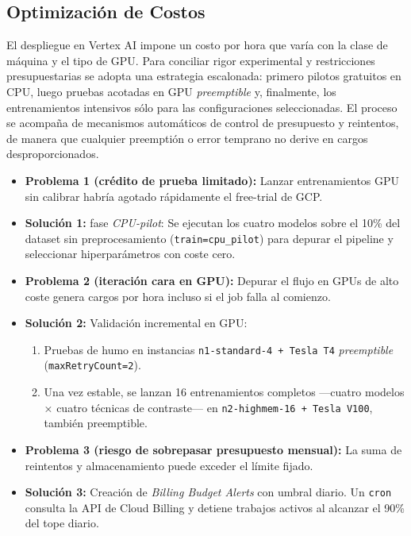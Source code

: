 \subsection{Optimización de Costos}

El despliegue en Vertex AI impone un costo por hora que varía con la clase de máquina y el tipo de GPU.
Para conciliar rigor experimental y restricciones presupuestarias se adopta una estrategia escalonada: primero pilotos gratuitos en CPU, luego pruebas acotadas en GPU \emph{preemptible} y, finalmente, los entrenamientos intensivos sólo para las configuraciones seleccionadas.
El proceso se acompaña de mecanismos automáticos de control de presupuesto y reintentos, de manera que cualquier preemptión o error temprano no derive en cargos desproporcionados.

\begin{itemize}
   \item \textbf{Problema 1 (crédito de prueba limitado):}
   Lanzar entrenamientos GPU sin calibrar habría agotado rápidamente el free-trial de GCP.
   \item \textbf{Solución 1:} fase \textit{CPU-pilot}:
   Se ejecutan los cuatro modelos sobre el 10\% del dataset sin preprocesamiento (\texttt{train=cpu\_pilot}) para depurar el pipeline y seleccionar hiperparámetros con coste cero.

   \item \textbf{Problema 2 (iteración cara en GPU):}
   Depurar el flujo en GPUs de alto coste genera cargos por hora incluso si el job falla al comienzo.
   \item \textbf{Solución 2:}
   Validación incremental en GPU:
         \begin{enumerate}
           \item Pruebas de humo en instancias \texttt{n1-standard-4 + Tesla T4} \emph{preemptible} (\texttt{maxRetryCount=2}).
           \item Una vez estable, se lanzan 16 entrenamientos completos —cuatro modelos × cuatro técnicas de contraste— en \texttt{n2-highmem-16 + Tesla V100}, también preemptible.
         \end{enumerate}

   \item \textbf{Problema 3 (riesgo de sobrepasar presupuesto mensual):}
   La suma de reintentos y almacenamiento puede exceder el límite fijado.
   \item \textbf{Solución 3:}
   Creación de \textit{Billing Budget Alerts} con umbral diario.
   Un \texttt{cron} consulta la API de Cloud Billing y detiene trabajos activos al alcanzar el 90\% del tope diario.
\end{itemize}

